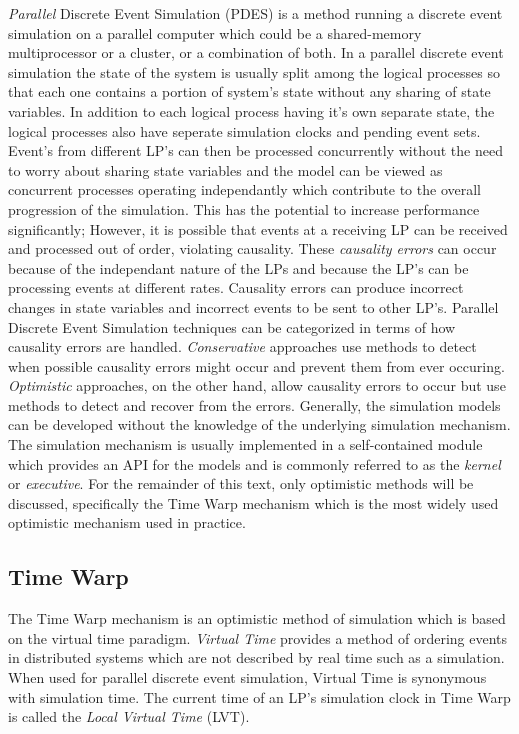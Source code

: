 \documentclass[11pt]{book}
\begin{document}
\emph{Parallel} Discrete Event Simulation (PDES) is a method running a discrete event
simulation on a parallel computer which could be a shared-memory multiprocessor or a
cluster, or a combination of both. In a parallel discrete event simulation the state of
the system is usually split among the logical processes so that each one contains a portion
of system's state without any sharing of state variables\cite{fujimoto-90}. In addition to
each logical process having it's own separate state, the logical processes also have seperate
simulation clocks and pending event sets. Event's from different LP's can then be processed
concurrently without the need to worry about sharing state variables and the model can be
viewed as concurrent processes operating independantly which contribute to the overall
progression of the simulation. This has the potential to increase performance significantly;
However, it is possible that events at a receiving LP can be received and processed out of
order, violating causality. These \emph{causality errors} can occur because of the independant
nature of the LPs and because the LP's can be processing events at different rates.
Causality errors can produce incorrect changes in state variables and incorrect events to
be sent to other LP's. Parallel Discrete Event Simulation techniques can be categorized in
terms of how causality errors are handled. \emph{Conservative} approaches use methods to
detect when possible causality errors might occur and prevent them from ever occuring.
\emph{Optimistic} approaches, on the other hand, allow causality errors to occur but use
methods to detect and recover from the errors. Generally, the simulation models can be
developed without the knowledge of the underlying simulation mechanism. The simulation
mechanism is usually implemented in a self-contained module which provides an API for the
models and is commonly referred to as the \emph{kernel} or \emph{executive}. For the remainder
of this text, only optimistic methods will be discussed, specifically the Time Warp mechanism
which is the most widely used optimistic mechanism used in practice.

\subsection{Time Warp}

The Time Warp mechanism is an optimistic method of simulation which is based on the virtual
time paradigm\cite{jefferson-85}. \emph{Virtual Time} provides a method of ordering events
in distributed systems which are not described by real time such as a simulation. When used
for parallel discrete event simulation, Virtual Time is synonymous with simulation time.
The current time of an LP's simulation clock in Time Warp is called the \emph{Local Virtual
Time} (LVT).
\end{document}
